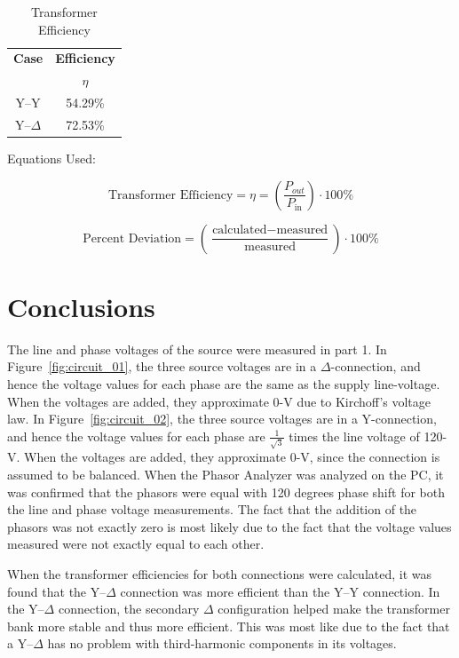 \documentclass{article}
\begin{document}
\begin{table}[H]
  \centering
  \begin{tabular}{*{2}{c}}
    \textbf{Case} & \textbf{Efficiency} \\
    & $\eta$ \\

    \hline

    Y--Y        & 54.29\% \\
    Y--$\Delta$ & 72.53\% \\
  \end{tabular}
  \caption{Transformer Efficiency}
  \label{tab:efficiency}
\end{table}



Equations Used:

\[\text{Transformer Efficiency} = \eta =
\left(\frac{P_{out}}{P_\text{in}}\right) \cdot 100\% \]

\[\text{Percent Deviation} = \left(\frac{\text{calculated} -
\text{measured}}{\text{measured}}\right) \cdot 100\%\]

\section{Conclusions}

The line and phase voltages of the source were measured in part 1. In
Figure~\ref{fig:circuit_01}, the three source voltages are in a
$\Delta$-connection, and hence the voltage values for each phase are the same
as the supply line-voltage.  When the voltages are added, they approximate 0-V
due to Kirchoff's voltage law. In Figure~\ref{fig:circuit_02}, the three source
voltages are in a Y-connection, and hence the voltage values for each phase are
$\frac{1}{\sqrt{3}}$ times the line voltage of 120-V.  When the voltages are
added, they approximate 0-V, since the connection is assumed to be balanced.
When the Phasor Analyzer was analyzed on the {PC}, it was confirmed that the
phasors were equal with 120 degrees phase shift for both the line and phase
voltage measurements. The fact that the addition of the phasors was not exactly
zero is most likely due to the fact that the voltage values measured were not
exactly equal to each other.

When the transformer efficiencies for both connections were calculated, it was
found that the Y--$\Delta$ connection was more efficient than the Y--Y
connection. In the Y--$\Delta$ connection, the secondary $\Delta$ configuration
helped make the transformer bank more stable and thus more efficient. This was
most like due to the fact that a Y--$\Delta$ has no problem with third-harmonic
components in its voltages.
\end{document}
